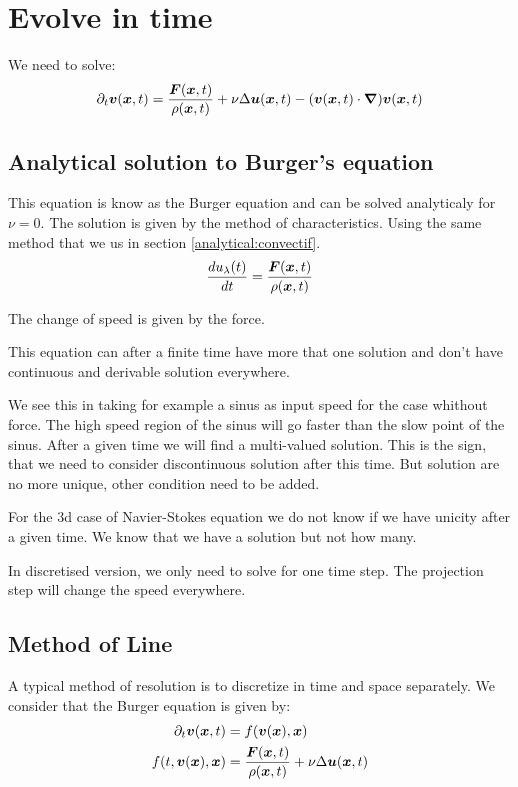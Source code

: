 \section{Evolve in time}

We need to solve:
  \begin{equation}
   \partial_t {\boldsymbol {v}}({\boldsymbol {x}} ,t)=\frac{{\boldsymbol {F}}({\boldsymbol {x}},t)}{\rho({\boldsymbol {x}},t)}+\nu \Delta {\boldsymbol {u}}({\boldsymbol {x}},t)-({\boldsymbol {v}}({\boldsymbol {x}},t)\cdot{\boldsymbol {\nabla}} ) {\boldsymbol {v}}({\boldsymbol {x}} ,t)
  \end{equation}
  
  \subsection{Analytical solution to Burger's equation}
  This equation is know as the Burger equation and can be solved analyticaly for $\nu=0$.
  The solution is given by the method of characteristics. Using the same method that we us in section \ref{analytical:convectif}.
  \begin{equation}
   \frac{d u_{\lambda}(t)}{dt}=\frac{{\boldsymbol {F}}({\boldsymbol {x}},t)}{\rho({\boldsymbol {x}},t)}
  \end{equation}
  
  The change of speed is given by the force.
  
  This equation can after a finite time have more that one solution and don't have continuous and derivable solution everywhere.
  
  We see this in taking for example a sinus as input speed for the case whithout force.
  The high speed region of the sinus will go faster than the slow point of the sinus.
  After a given time we will find a multi-valued solution. This is the sign, that we need to consider discontinuous solution after this time.
  But solution are no more unique, other condition need to be added.
  
  For the 3d case of Navier-Stokes equation we do not know if we have unicity after a given time.
  We know that we have a solution but not how many.
  
  In discretised version, we only need to solve for one time step.
  The projection step will change the speed everywhere.

  \subsection{Method of Line}
  
  A typical method of resolution is to discretize in time and space separately.
  We consider that the Burger equation is given by:
  \begin{align}
   \label{fixed:lineA}
   \partial_t {\boldsymbol {v}}({\boldsymbol {x}} ,t)&=f({\boldsymbol {v}}({\boldsymbol {x}}),{\boldsymbol {x}})\\
   \label{fixed:lineB}
   f(t,{\boldsymbol {v}}({\boldsymbol {x}}),{\boldsymbol {x}})&=\frac{{\boldsymbol {F}}({\boldsymbol {x}},t)}{\rho({\boldsymbol {x}},t)}+\nu \Delta {\boldsymbol {u}}({\boldsymbol {x}},t)
  \end{align}
  
